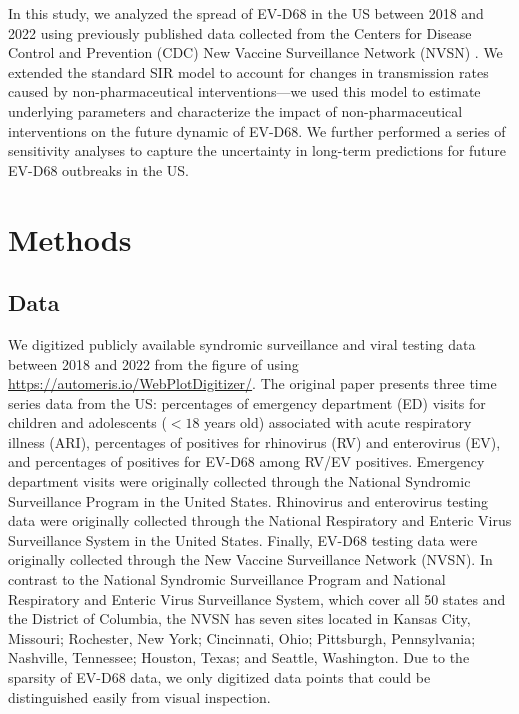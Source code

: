 \documentclass[12pt]{article}
\begin{document}
In this study, we analyzed the spread of EV-D68 in the US between 2018 and 2022 using previously published data collected from the Centers for Disease Control and Prevention (CDC) New Vaccine Surveillance Network (NVSN) \citep{ma2022increase}.
We extended the standard SIR model to account for changes in transmission rates caused by non-pharmaceutical interventions---we used this model to estimate underlying parameters and characterize the impact of non-pharmaceutical interventions on the future dynamic of EV-D68.
We further performed a series of sensitivity analyses to capture the uncertainty in long-term predictions for future EV-D68 outbreaks in the US.

\section{Methods}

\subsection{Data}

We digitized publicly available syndromic surveillance and viral testing data between 2018 and 2022 from the figure of \cite{ma2022increase} using \url{https://automeris.io/WebPlotDigitizer/}.
The original paper presents three time series data from the US: percentages of emergency department (ED) visits for children and adolescents ($<18$ years old) associated with acute respiratory illness (ARI), percentages of positives for rhinovirus (RV) and enterovirus (EV), and percentages of positives for EV-D68 among RV/EV positives.
Emergency department visits were originally collected through the National Syndromic Surveillance Program in the United States.
Rhinovirus and enterovirus testing data were originally collected through the National Respiratory and Enteric Virus Surveillance System in the United States.
Finally, EV-D68 testing data were originally collected through the New Vaccine Surveillance Network (NVSN).
In contrast to the National Syndromic Surveillance Program and National Respiratory and Enteric Virus Surveillance System, which cover all 50 states and the District of Columbia, the NVSN has seven sites located in Kansas City, Missouri; Rochester, New York; Cincinnati, Ohio; Pittsburgh, Pennsylvania; Nashville, Tennessee; Houston, Texas; and Seattle, Washington.
Due to the sparsity of EV-D68 data, we only digitized data points that could be distinguished easily from visual inspection.
\end{document}
